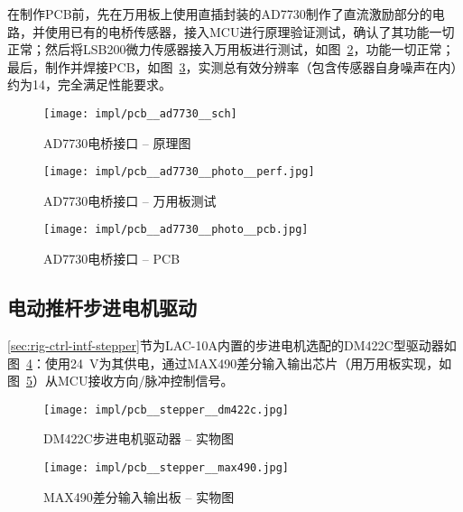 在制作PCB前，先在万用板上使用直插封装的AD7730制作了直流激励部分的电路，并使用已有的电桥传感器，接入MCU进行原理验证测试，确认了其功能一切正常；然后将LSB200微力传感器接入万用板进行测试，如图~\ref{fig:impl-pcb-ad7730-photo-perf}，功能一切正常；最后，制作并焊接PCB，如图~\ref{fig:impl-pcb-ad7730-photo-pcb}，实测总有效分辨率（包含传感器自身噪声在内）约为\SI{14}{\bit}，完全满足性能要求。

\begin{figure}[tbhp]
\centering
\texttt{[image: impl/pcb\_\_ad7730\_\_sch]}
\caption{AD7730电桥接口 -- 原理图}
\label{fig:impl-pcb-ad7730-sch}
\end{figure}

\begin{figure}[tbhp]
\centering
\texttt{[image: impl/pcb\_\_ad7730\_\_photo\_\_perf.jpg]}
\caption{AD7730电桥接口 -- 万用板测试}
\label{fig:impl-pcb-ad7730-photo-perf}
\end{figure}

\begin{figure}[tbhp]
\centering
\texttt{[image: impl/pcb\_\_ad7730\_\_photo\_\_pcb.jpg]}
\caption{AD7730电桥接口 -- PCB}
\label{fig:impl-pcb-ad7730-photo-pcb}
\end{figure}


\clearpage



\subsection{电动推杆步进电机驱动}\label{sec:impl-pcb-stepper}

\ref{sec:rig-ctrl-intf-stepper}节为LAC-10A内置的步进电机选配的DM422C型驱动器如图~\ref{fig:impl-pcb-stepper-dm422c}：使用\SI{+24}{\V}为其供电，通过MAX490差分输入输出芯片（用万用板实现，如图~\ref{fig:impl-pcb-stepper-max490}）从MCU接收方向/脉冲控制信号。

\begin{figure}[tbhp]
\centering
\texttt{[image: impl/pcb\_\_stepper\_\_dm422c.jpg]}
\caption{DM422C步进电机驱动器 -- 实物图}
\label{fig:impl-pcb-stepper-dm422c}
\end{figure}

\begin{figure}[tbhp]
\centering
\texttt{[image: impl/pcb\_\_stepper\_\_max490.jpg]}
\caption{MAX490差分输入输出板 -- 实物图}
\label{fig:impl-pcb-stepper-max490}
\end{figure}


